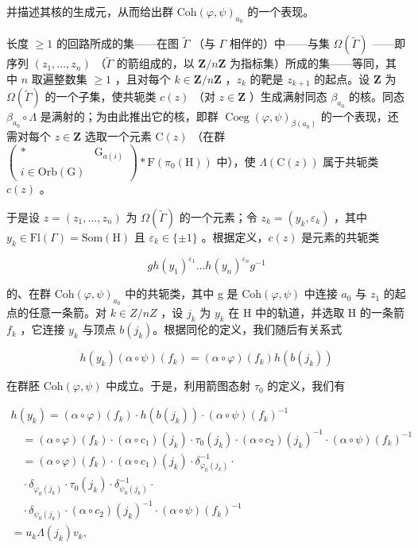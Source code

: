 并描述其核的生成元，从而给出群 \(\mathrm{Coh}(\varphi,\psi)_{a_{0}}\) 的一个表现。

长度 \(\geqslant 1\) 的回路所成的集——在图 \(\widetilde{\Gamma}\) （与 \(\Gamma\) 相伴的）中——与集 \(\Omega(\widetilde{\Gamma})\) ——即序列 \((z_1, \ldots, z_n)\) （\(\widetilde{\Gamma}\) 的箭组成的，以 \(\mathbf{Z}/n\mathbf{Z}\) 为指标集）所成的集——等同，其中 \(n\) 取遍整数集 \(\geqslant 1\) ，且对每个 \(k \in \mathbf{Z}/n\mathbf{Z}\) ，\(z_k\) 的靶是 \(z_{k+1}\) 的起点。设 \(\mathbf{Z}\) 为 \(\Omega(\widetilde{\Gamma})\) 的一个子集，使共轭类 \(c(z)\) （对 \(z \in \mathbf{Z}\) ）生成满射同态 \(\beta_{a_0}\) 的核。同态 \(\beta_{a_0} \circ \Lambda\) 是满射的；为由此推出它的核，即群 \(\operatorname{Coeg}(\varphi, \psi)_{\beta(a_0)}\) 的一个表现，还需对每个 \(z \in \mathbf{Z}\) 选取一个元素 \(\mathrm{C}(z)\) （在群 \(\left( \begin{array}{cc} * & \mathrm{G}_{a(i)} \\ i \in \mathrm{Orb}(\mathrm{G}) & \end{array} \right) * \mathrm{F}(\pi_0(\mathrm{H}))\) 中），使 \(\Lambda(\mathrm{C}(z))\) 属于共轭类 \(c(z)\) 。

于是设 \(z = (z_{1}, \ldots, z_{n})\) 为 \(\Omega(\tilde{\Gamma})\) 的一个元素；令 \(z_{k} = (y_{k}, \varepsilon_{k})\) ，其中 \(y_{k} \in \mathrm{Fl}(\Gamma) = \mathrm{Som}(\mathrm{H})\) 且 \(\varepsilon_{k} \in \{\pm 1\}\) 。根据定义，\(c(z)\) 是元素的共轭类

\[
g h (y _ {1}) ^ {\varepsilon_ {1}} \dots h (y _ {n}) ^ {\varepsilon_ {n}} g ^ {- 1}
\]

的、在群 \(\mathrm{Coh}(\varphi,\psi)_{a_{0}}\) 中的共轭类，其中 g 是 \(\mathrm{Coh}(\varphi,\psi)\) 中连接 \(a_{0}\) 与 \(z_{1}\) 的起点的任意一条箭。对 \(k \in Z/nZ\) ，设 \(j_{k}\) 为 \(y_{k}\) 在 H 中的轨道，并选取 H 的一条箭 \(f_{k}\) ，它连接 \(y_{k}\) 与顶点 \(b(j_{k})\)。根据同伦的定义，我们随后有关系式

\[
h (y _ {k}) (\alpha \circ \psi) (f _ {k}) = (\alpha \circ \varphi) (f _ {k}) h (b (j _ {k}))
\]

在群胚 \(\mathrm{Coh}(\varphi,\psi)\) 中成立。于是，利用箭图态射 \(\tau_{0}\) 的定义，我们有

\[
\begin{array}{l} h (y _ {k}) = (\alpha \circ \varphi) (f _ {k}) \cdot h (b (j _ {k})) \cdot (\alpha \circ \psi) (f _ {k}) ^ {- 1} \\ \quad = (\alpha \circ \varphi) (f _ {k}) \cdot (\alpha \circ c _ {1}) (j _ {k}) \cdot \tau_ {0} (j _ {k}) \cdot (\alpha \circ c _ {2}) (j _ {k}) ^ {- 1} \cdot (\alpha \circ \psi) (f _ {k}) ^ {- 1} \\ \quad = (\alpha \circ \varphi) (f _ {k}) \cdot (\alpha \circ c _ {1}) (j _ {k}) \cdot \delta_ {\varphi_ {0} (j _ {k})} ^ {- 1} \cdot \\ \quad \cdot \delta_ {\varphi_ {0} (j _ {k})} \cdot \tau_ {0} (j _ {k}) \cdot \delta_ {\psi_ {0} (j _ {k})} ^ {- 1} \cdot \\ \quad \cdot \delta_ {\psi_ {0} (j _ {k})} \cdot (\alpha \circ c _ {2}) (j _ {k}) ^ {- 1} \cdot (\alpha \circ \psi) (f _ {k}) ^ {- 1} \\ = u _ {k} \Lambda (j _ {k}) v _ {k}, \end{array}
\]

